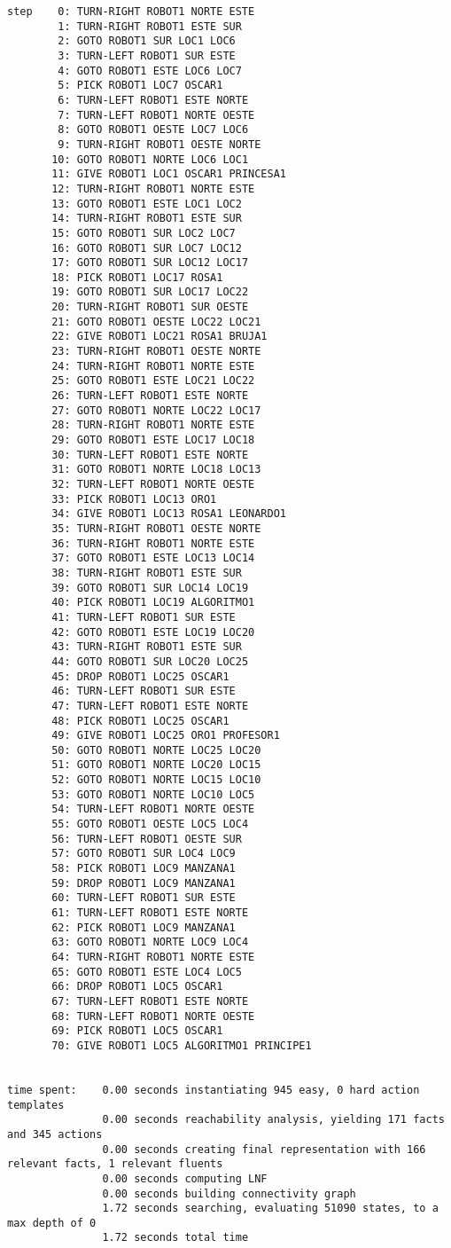 \documentclass{article}
\begin{document}
\begin{lstlisting}
step    0: TURN-RIGHT ROBOT1 NORTE ESTE
        1: TURN-RIGHT ROBOT1 ESTE SUR
        2: GOTO ROBOT1 SUR LOC1 LOC6
        3: TURN-LEFT ROBOT1 SUR ESTE
        4: GOTO ROBOT1 ESTE LOC6 LOC7
        5: PICK ROBOT1 LOC7 OSCAR1
        6: TURN-LEFT ROBOT1 ESTE NORTE
        7: TURN-LEFT ROBOT1 NORTE OESTE
        8: GOTO ROBOT1 OESTE LOC7 LOC6
        9: TURN-RIGHT ROBOT1 OESTE NORTE
       10: GOTO ROBOT1 NORTE LOC6 LOC1
       11: GIVE ROBOT1 LOC1 OSCAR1 PRINCESA1
       12: TURN-RIGHT ROBOT1 NORTE ESTE
       13: GOTO ROBOT1 ESTE LOC1 LOC2
       14: TURN-RIGHT ROBOT1 ESTE SUR
       15: GOTO ROBOT1 SUR LOC2 LOC7
       16: GOTO ROBOT1 SUR LOC7 LOC12
       17: GOTO ROBOT1 SUR LOC12 LOC17
       18: PICK ROBOT1 LOC17 ROSA1
       19: GOTO ROBOT1 SUR LOC17 LOC22
       20: TURN-RIGHT ROBOT1 SUR OESTE
       21: GOTO ROBOT1 OESTE LOC22 LOC21
       22: GIVE ROBOT1 LOC21 ROSA1 BRUJA1
       23: TURN-RIGHT ROBOT1 OESTE NORTE
       24: TURN-RIGHT ROBOT1 NORTE ESTE
       25: GOTO ROBOT1 ESTE LOC21 LOC22
       26: TURN-LEFT ROBOT1 ESTE NORTE
       27: GOTO ROBOT1 NORTE LOC22 LOC17
       28: TURN-RIGHT ROBOT1 NORTE ESTE
       29: GOTO ROBOT1 ESTE LOC17 LOC18
       30: TURN-LEFT ROBOT1 ESTE NORTE
       31: GOTO ROBOT1 NORTE LOC18 LOC13
       32: TURN-LEFT ROBOT1 NORTE OESTE
       33: PICK ROBOT1 LOC13 ORO1
       34: GIVE ROBOT1 LOC13 ROSA1 LEONARDO1
       35: TURN-RIGHT ROBOT1 OESTE NORTE
       36: TURN-RIGHT ROBOT1 NORTE ESTE
       37: GOTO ROBOT1 ESTE LOC13 LOC14
       38: TURN-RIGHT ROBOT1 ESTE SUR
       39: GOTO ROBOT1 SUR LOC14 LOC19
       40: PICK ROBOT1 LOC19 ALGORITMO1
       41: TURN-LEFT ROBOT1 SUR ESTE
       42: GOTO ROBOT1 ESTE LOC19 LOC20
       43: TURN-RIGHT ROBOT1 ESTE SUR
       44: GOTO ROBOT1 SUR LOC20 LOC25
       45: DROP ROBOT1 LOC25 OSCAR1
       46: TURN-LEFT ROBOT1 SUR ESTE
       47: TURN-LEFT ROBOT1 ESTE NORTE
       48: PICK ROBOT1 LOC25 OSCAR1
       49: GIVE ROBOT1 LOC25 ORO1 PROFESOR1
       50: GOTO ROBOT1 NORTE LOC25 LOC20
       51: GOTO ROBOT1 NORTE LOC20 LOC15
       52: GOTO ROBOT1 NORTE LOC15 LOC10
       53: GOTO ROBOT1 NORTE LOC10 LOC5
       54: TURN-LEFT ROBOT1 NORTE OESTE
       55: GOTO ROBOT1 OESTE LOC5 LOC4
       56: TURN-LEFT ROBOT1 OESTE SUR
       57: GOTO ROBOT1 SUR LOC4 LOC9
       58: PICK ROBOT1 LOC9 MANZANA1
       59: DROP ROBOT1 LOC9 MANZANA1
       60: TURN-LEFT ROBOT1 SUR ESTE
       61: TURN-LEFT ROBOT1 ESTE NORTE
       62: PICK ROBOT1 LOC9 MANZANA1
       63: GOTO ROBOT1 NORTE LOC9 LOC4
       64: TURN-RIGHT ROBOT1 NORTE ESTE
       65: GOTO ROBOT1 ESTE LOC4 LOC5
       66: DROP ROBOT1 LOC5 OSCAR1
       67: TURN-LEFT ROBOT1 ESTE NORTE
       68: TURN-LEFT ROBOT1 NORTE OESTE
       69: PICK ROBOT1 LOC5 OSCAR1
       70: GIVE ROBOT1 LOC5 ALGORITMO1 PRINCIPE1


time spent:    0.00 seconds instantiating 945 easy, 0 hard action templates
               0.00 seconds reachability analysis, yielding 171 facts and 345 actions
               0.00 seconds creating final representation with 166 relevant facts, 1 relevant fluents
               0.00 seconds computing LNF
               0.00 seconds building connectivity graph
               1.72 seconds searching, evaluating 51090 states, to a max depth of 0
               1.72 seconds total time
\end{lstlisting}
\end{document}
